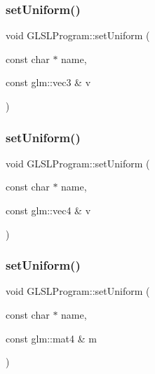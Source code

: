 \subsubsection{\texorpdfstring{setUniform()}{setUniform()}\hspace{0.1cm}{\footnotesize\ttfamily [3/10]}}
{\footnotesize\ttfamily void G\+L\+S\+L\+Program\+::set\+Uniform (\begin{DoxyParamCaption}\item[{const char $\ast$}]{name,  }\item[{const glm\+::vec3 \&}]{v }\end{DoxyParamCaption})}

\mbox{\label{class_g_l_s_l_program_a9940fb2fedc6a3a3bf3719fdb544129f}} 
\subsubsection{\texorpdfstring{setUniform()}{setUniform()}\hspace{0.1cm}{\footnotesize\ttfamily [4/10]}}
{\footnotesize\ttfamily void G\+L\+S\+L\+Program\+::set\+Uniform (\begin{DoxyParamCaption}\item[{const char $\ast$}]{name,  }\item[{const glm\+::vec4 \&}]{v }\end{DoxyParamCaption})}

\mbox{\label{class_g_l_s_l_program_a83bee010f567acc80b40ecd474ed4fe7}} 
\subsubsection{\texorpdfstring{setUniform()}{setUniform()}\hspace{0.1cm}{\footnotesize\ttfamily [5/10]}}
{\footnotesize\ttfamily void G\+L\+S\+L\+Program\+::set\+Uniform (\begin{DoxyParamCaption}\item[{const char $\ast$}]{name,  }\item[{const glm\+::mat4 \&}]{m }\end{DoxyParamCaption})}

\mbox{\label{class_g_l_s_l_program_a39921eec3ba44044f1bc15d7102bba20}} 
